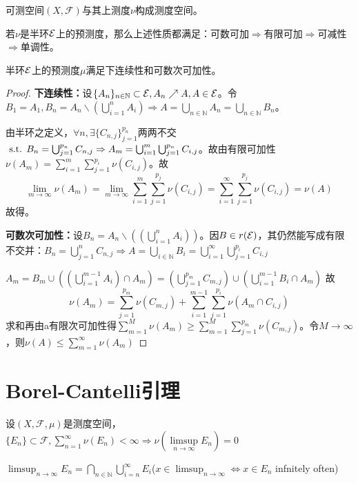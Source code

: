 \documentclass{ctexbook}
\begin{document}
\begin{Def}[测度空间]
  可测空间$(X,\mathscr{F})$与其上测度$\nu$构成测度空间。
\end{Def}


若$\nu$是半环$\mathcal{E}$上的预测度，那么上述性质都满足：可数可加$\Rightarrow$有限可加$\Rightarrow$可减性$\Rightarrow$单调性。

\begin{Thm}
  半环$\mathcal{E}$上的预测度$\mu$满足下连续性和可数次可加性。
\end{Thm}


\begin{proof}
  \textbf{下连续性：}设$\{A_{n}\}_{n\in\mathbb{N}}\subset \mathcal{E},A_{n}\nearrow A,A\in\mathcal{E}$。令$B_{1}=A_{1},B_{n}=A_{n}\backslash (\bigcup_{i=1}^{n}A_{i})\Rightarrow A=\bigcup_{n\in\mathbb{N}}A_{n}=\bigcup_{n\in\mathbb{N}}B_{n}$。

  由半环之定义，$\forall n,\exists\{C_{n,j}\}_{j=1}^{p_{n}}$两两不交$\text{ s.t. } B_{n}=\bigcup_{j=1}^{p_{n}}C_{n,j}\Rightarrow A_{m}=\bigcup_{i=1}^{m}\bigcup_{j=1}^{p_{n}}C_{i,j}$。故由有限可加性$\nu(A_{m})=\sum_{i=1}^{m}\sum_{j=1}^{p_{i}}\nu(C_{i,j})$。故  
\[\lim_{m\to\infty}\nu(A_{m})=\lim_{m\to\infty}\sum_{i=1}^{m}\sum_{j=1}^{p_{j}}\nu(C_{i,j})=\sum_{i=1}^{\infty}\sum_{j=1}^{p_{j}}\nu(C_{i,j})=\nu(A)\]
故得。

\textbf{可数次可加性：}设$B_{n}=A_{n}\backslash ((\bigcup_{i=1}^{n}A_{i}))$。因$B\in r(\mathcal{E})$，其仍然能写成有限不交并：$B_{n}=\bigcup_{j=1}^{n}C_{n,j}\Rightarrow A=\bigcup_{i\in\mathbb{N}}B_{i}=\bigcup_{i=1}^{\infty}\bigcup_{j=1}^{p_{i}}C_{i,j}$

$A_{m}=B_{m}\cup((\bigcup_{i=1}^{m-1}A_{i})\cap A_{m})
=(\bigcup_{j=1}^{p_{m}}C_{m,j})\cup (\bigcup_{i=1}^{m-1}B_{i}\cap A_{m})$
故
\[\nu(A_{m})=\sum_{j=1}^{p_{m}}\nu(C_{m,j})+\sum_{i=1}^{m-1}\sum_{j=1}^{p_{i}}\nu(A_{m}\cap C_{i,j})
\]
求和再由a有限次可加性得$\sum_{m=1}^{M}\nu(A_{m})\geq \sum_{m=1}^{M}\sum_{j=1}^{p_{m}}\nu(C_{m,j})$。令$M\to\infty$，则$\nu(A)\leq \sum_{m=1}^{\infty}\nu(A_{m})$
\end{proof}

\section{Borel-Cantelli引理}
\begin{Thm}
  设$(X,\mathscr{F},\mu)$是测度空间，$\{E_{n}\}\subset\mathscr{F},\sum_{n=1}^{\infty}\nu(E_{n})<\infty\Rightarrow \nu(\limsup\limits_{n\to\infty}E_{n})=0$
\end{Thm}
$\limsup_{n\to\infty}E_{n}=\bigcap_{n\in\mathbb{N}}\bigcup_{i=n}^{\infty}E_{i}$($x\in\limsup_{n\to\infty}\Leftrightarrow x\in E_{n}$ infnitely often)
\end{document}
